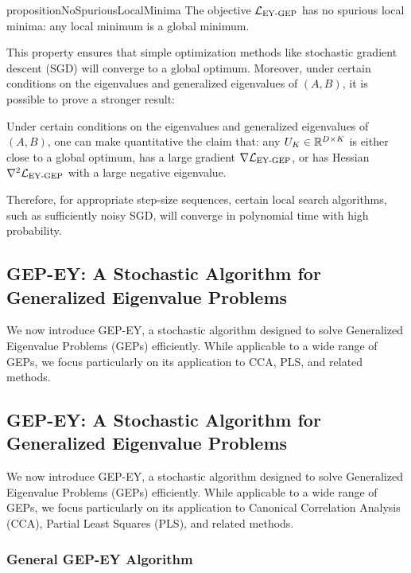 \begin{restatable}{proposition}{NoSpuriousLocalMinima}\label{prop:no-spurious}
The objective $\mathcal{L}_\text{EY-GEP}$ has no spurious local minima: any local minimum is a global minimum.
\end{restatable}

This property ensures that simple optimization methods like stochastic gradient descent (SGD) will converge to a global optimum. Moreover, under certain conditions on the eigenvalues and generalized eigenvalues of $(A,B)$, it is possible to prove a stronger result:
\begin{corollary}
    Under certain conditions on the eigenvalues and generalized eigenvalues of $(A,B)$, one can make quantitative the claim that:
    any $U_K \in \mathbb{R}^{D \times K}$ is either close to a global optimum, has a large gradient $\nabla \mathcal{L}_\text{EY-GEP}$, or has Hessian $\nabla^2 \mathcal{L}_\text{EY-GEP}$ with a large negative eigenvalue.
    
    Therefore, for appropriate step-size sequences, certain local search algorithms, such as sufficiently noisy SGD, will converge in polynomial time with high probability.
\end{corollary}
\subsection{GEP-EY: A Stochastic Algorithm for Generalized Eigenvalue Problems}

We now introduce GEP-EY, a stochastic algorithm designed to solve Generalized Eigenvalue Problems (GEPs) efficiently. While applicable to a wide range of GEPs, we focus particularly on its application to CCA, PLS, and related methods.

\subsection{GEP-EY: A Stochastic Algorithm for Generalized Eigenvalue Problems}

We now introduce GEP-EY, a stochastic algorithm designed to solve Generalized Eigenvalue Problems (GEPs) efficiently. While applicable to a wide range of GEPs, we focus particularly on its application to Canonical Correlation Analysis (CCA), Partial Least Squares (PLS), and related methods.

\subsubsection{General GEP-EY Algorithm}

